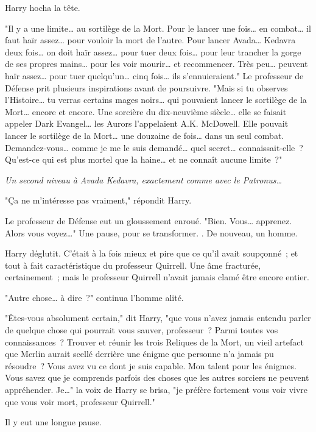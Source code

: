Harry hocha la tête.

"Il y a une limite… au sortilège de la Mort. Pour le lancer une fois… en combat… il faut haïr assez… pour vouloir la mort de l'autre. Pour lancer Avada… Kedavra deux fois… on doit haïr assez… pour tuer deux fois… pour leur trancher la gorge de ses propres mains… pour les voir mourir… et recommencer. Très peu… peuvent haïr assez… pour tuer quelqu'un… cinq fois… ils s'ennuieraient." Le professeur de Défense prit plusieurs inspirations avant de poursuivre. "Mais si tu observes l'Histoire… tu verras certains mages noirs… qui pouvaient lancer le sortilège de la Mort… encore et encore. Une sorcière du dix-neuvième siècle… elle se faisait appeler Dark Evangel… les Aurors l'appelaient A.K. McDowell. Elle pouvait lancer le sortilège de la Mort… une douzaine de fois… dans un seul combat. Demandez-vous… comme je me le suis demandé… quel secret… connaissait-elle~? Qu'est-ce qui est plus mortel que la haine… et ne connaît aucune limite~?"

\emph{Un second niveau à Avada Kedavra, exactement comme avec le Patronus…}

"Ça ne m'intéresse pas vraiment," répondit Harry.

Le professeur de Défense eut un gloussement enroué. "Bien. Vous… apprenez. Alors vous voyez…" Une pause, pour se transformer. . De nouveau, un homme.

Harry déglutit. C'était à la fois mieux et pire que ce qu'il avait soupçonné~; et tout à fait caractéristique du professeur Quirrell. Une âme fracturée, certainement~; mais le professeur Quirrell n'avait jamais clamé être encore entier.

"Autre chose… à dire~?" continua l'homme alité.

"Êtes-vous absolument certain," dit Harry, "que vous n'avez jamais entendu parler de quelque chose qui pourrait vous sauver, professeur~? Parmi toutes vos connaissances~? Trouver et réunir les trois Reliques de la Mort, un vieil artefact que Merlin aurait scellé derrière une énigme que personne n'a jamais pu résoudre~? Vous avez vu ce dont je suis capable. Mon talent pour les énigmes. Vous savez que je comprends parfois des choses que les autres sorciers ne peuvent appréhender. Je…" la voix de Harry se brisa, "je préfère fortement vous voir vivre que vous voir mort, professeur Quirrell."

Il y eut une longue pause.

